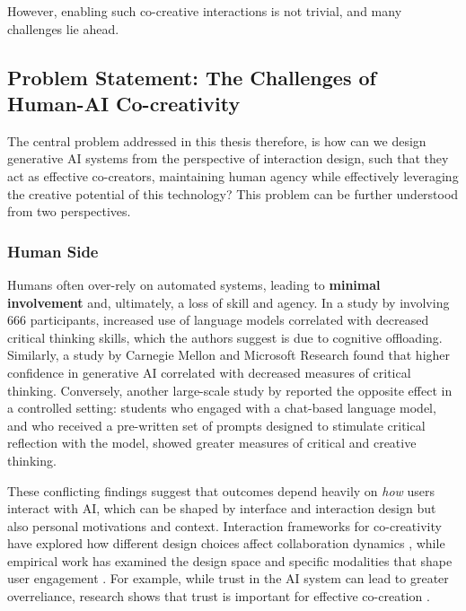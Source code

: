 However, enabling such co-creative interactions is not trivial, and many challenges lie ahead. 

\subsection{Problem Statement: The Challenges of Human-AI Co-creativity}
The central problem addressed in this thesis therefore, is how can we design generative AI systems from the perspective of interaction design, such that they act as effective co-creators, maintaining human agency while effectively leveraging the creative potential of this technology? This problem can be further understood from two perspectives.

\subsubsection{Human Side}

Humans often over-rely on automated systems, leading to \textbf{minimal involvement} and, ultimately, a loss of skill and agency. In a study by \citet{Gerlich2025-as} involving 666 participants, increased use of language models correlated with decreased critical thinking skills, which the authors suggest is due to cognitive offloading. Similarly, a study by Carnegie Mellon and Microsoft Research \citep{Lee2025-dw} found that higher confidence in generative AI correlated with decreased measures of critical thinking. Conversely, another large-scale study by \citet{Essel2024-qc} reported the opposite effect in a controlled setting: students who engaged with a chat-based language model, and who received a pre-written set of prompts designed to stimulate critical reflection with the model, showed greater measures of critical and creative thinking.

These conflicting findings suggest that outcomes depend heavily on \emph{how} users interact with AI, which can be shaped by interface and interaction design but also personal motivations and context. Interaction frameworks for co-creativity have explored how different design choices affect collaboration dynamics \citep{Kantosalo2020-nh, Rezwana2022-gg, Moruzzi2024-cq}, while empirical work has examined the design space and specific modalities that shape user engagement \citep{Lehmann2022-kr, Liapis2016-bv, Lin2023-jd, Karimi2020-cf, Abbas2024-sf}. For example, while trust in the AI system can lead to greater overreliance, research shows that trust is important for effective co-creation \citep{McCormack2019-yh, Louie2020-aq, Kruger2017-xa, McCormack2020-ix, Hutchings2020-bv, Wang2020-cw, Rezwana2022-ui}. 

